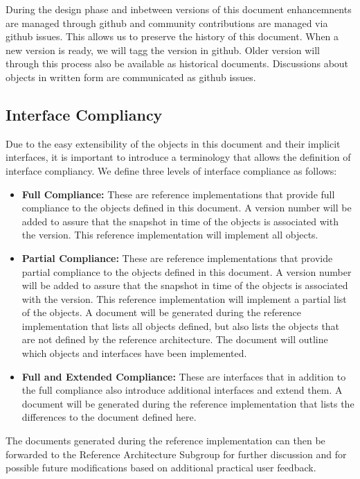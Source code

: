 \documentclass[9pt,]{article}
\begin{document}
During the design phase and inbetween versions of this document
enhancemnents are managed through github and community contributions are
managed via github issues. This allows us to preserve the history of
this document. When a new version is ready, we will tagg the version in
github. Older version will through this process also be available as
historical documents. Discussions about objects in written form are
communicated as github issues.

\hypertarget{interface-compliancy}{%
\subsection{Interface Compliancy}\label{interface-compliancy}}

Due to the easy extensibility of the objects in this document and their
implicit interfaces, it is important to introduce a terminology that
allows the definition of interface compliancy. We define three levels of
interface compliance as follows:

\begin{itemize}
\item
  \textbf{Full Compliance:} These are reference implementations that
  provide full compliance to the objects defined in this document. A
  version number will be added to assure that the snapshot in time of
  the objects is associated with the version. This reference
  implementation will implement all objects.
\item
  \textbf{Partial Compliance:} These are reference implementations that
  provide partial compliance to the objects defined in this document. A
  version number will be added to assure that the snapshot in time of
  the objects is associated with the version. This reference
  implementation will implement a partial list of the objects. A
  document will be generated during the reference implementation that
  lists all objects defined, but also lists the objects that are not
  defined by the reference architecture. The document will outline which
  objects and interfaces have been implemented.
\item
  \textbf{Full and Extended Compliance:} These are interfaces that in
  addition to the full compliance also introduce additional interfaces
  and extend them. A document will be generated during the reference
  implementation that lists the differences to the document defined
  here.
\end{itemize}

The documents generated during the reference implementation can then be
forwarded to the Reference Architecture Subgroup for further discussion
and for possible future modifications based on additional practical user
feedback.
\end{document}

